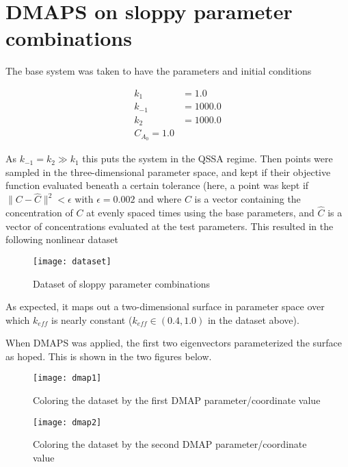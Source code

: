 \documentclass[11pt]{article}
\begin{document}
\section{DMAPS on sloppy parameter combinations}

The base system was taken to have the parameters and initial conditions

\begin{align*}
  k_1 &= 1.0 \\
  k_{-1} &= 1000.0 \\
  k_2 &= 1000.0 \\
  C_{A_0} = 1.0
\end{align*}

As $k_{-1} = k_2 \gg k_1$ this puts the system in the QSSA regime. Then points were sampled in the three-dimensional parameter space, and kept if their objective function evaluated beneath a certain tolerance (here, a point was kept if $\| C - \hat{C}\|^2 < \epsilon$ with $\epsilon = 0.002$ and where $C$ is a vector containing the concentration of $C$ at evenly spaced times using the base parameters, and $\hat{C}$ is a vector of concentrations evaluated at the test parameters. This resulted in the following nonlinear dataset

\begin{figure}[htbp]
  \centering
  \texttt{[image: dataset]}
  \caption{Dataset of sloppy parameter combinations}
\end{figure}

As expected, it maps out a two-dimensional surface in parameter space over which $k_{eff}$ is nearly constant ($k_{eff} \in (0.4, 1.0)$ in the dataset above).

When DMAPS was applied, the first two eigenvectors parameterized the surface as hoped. This is shown in the two figures below.

\begin{figure}[htbp]
  \centering
  \texttt{[image: dmap1]}
  \caption{Coloring the dataset by the first DMAP parameter/coordinate value}
\end{figure}

\begin{figure}[htbp]
  \centering
  \texttt{[image: dmap2]}
  \caption{Coloring the dataset by the second DMAP parameter/coordinate value}
\end{figure}


% 
% 
\end{document}
